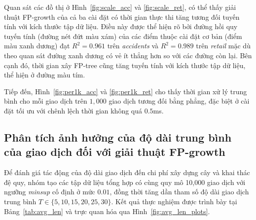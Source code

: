 \documentclass[conference]{IEEEtran}
\begin{document}
Quan sát các đồ thị ở Hình~\ref{fig:scale_acc} và \ref{fig:scale_ret}, có thể thấy giải thuật FP-growth của cả ba cài đặt có thời gian thực thi tăng tương đối tuyến tính với kích thước tập dữ liệu. Điều này được thể hiện rõ bởi đường hồi quy tuyến tính (đường nét đứt màu xám) của các điểm thuộc cài đặt cơ bản (điểm màu xanh dương) đạt $R^2 = 0.961$ trên \textit{accidents} và $R^2 = 0.989$ trên \textit{retail} mặc dù theo quan sát đường xanh dương có vẻ ít thẳng hơn so với các đường còn lại. Bên cạnh đó, thời gian xây FP-tree cũng tăng tuyến tính với kích thước tập dữ liệu, thể hiện ở đường màu tím.

Tiếp đến, Hình~\ref{fig:per1k_acc} và \ref{fig:per1k_ret} cho thấy thời gian xử lý trung bình cho mỗi giao dịch trên $1,000$ giao dịch tương đối bằng phẳng, đặc biệt ở cài đặt tối ưu với chênh lệch thời gian không quá $0.5$ms.

\subsection{Phân tích ảnh hưởng của độ dài trung bình của giao dịch đối với giải thuật FP-growth}
\label{subsection:avg-length}
Để đánh giá tác động của độ dài giao dịch đến chi phí xây dựng cây và khai thác đệ quy, nhóm tạo các tập dữ liệu tổng hợp có cùng quy mô 10,000 giao dịch với ngưỡng \textit{minsup} cố định ở mức $0.01$, đồng thời tăng dần tham số độ dài giao dịch trung bình $T \in \{5, 10, 15, 20, 25, 30\}$. Kết quả thực nghiệm được trình bày tại Bảng~\ref{tab:avg_len} và trực quan hóa qua Hình~\ref{fig:avg_len_plots}.
\end{document}
